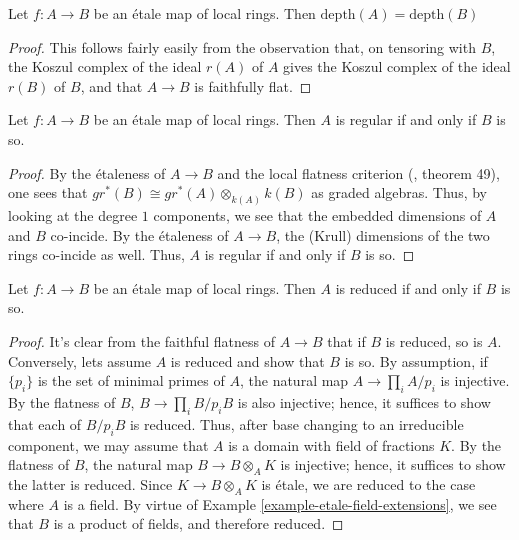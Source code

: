 \begin{proposition}
\label{proposition-etale-dimension}
Let $f : A \to B$ be an \'etale map of local rings. Then
$\mathrm{depth}(A) = \mathrm{depth}(B)$
\end{proposition}

\begin{proof}
This follows fairly easily from the observation that, on tensoring with
$B$, the Koszul complex of the ideal $r(A)$ of $A$ gives the Koszul complex
of the ideal $r(B)$ of $B$, and that $A \to B$ is faithfully flat.
\end{proof}

\begin{proposition}
\label{proposition-etale-regular}
Let $f : A \to B$ be an \'etale map of local rings. Then $A$ is regular if and
only if $B$ is so.
\end{proposition}

\begin{proof}
By the \'etaleness of $A \to B$ and the local flatness criterion
(\cite{MatCA}, theorem 49), one sees that
$gr^*(B) \cong gr^*(A) \otimes_{k(A)} k(B)$ as graded algebras. Thus,
by looking at the degree $1$ components, we see that the embedded
dimensions of $A$ and $B$ co-incide. By the \'etaleness of $A \to B$,
the (Krull) dimensions of the two rings co-incide as well. Thus, $A$ is
regular if and only if $B$ is so.
\end{proof}

\begin{proposition}
\label{proposition-etale-reduced}
Let $f : A \to B$ be an \'etale map of local rings. Then $A$ is reduced if and
only if $B$ is so.
\end{proposition}

\begin{proof}
It's clear from the faithful flatness of $A \to B$ that if $B$ is reduced, so
is $A$. Conversely, lets assume $A$ is reduced and show that $B$ is so. By
assumption, if $\{p_i\}$ is the set of minimal primes of $A$, the natural map
$A \to \prod_i A/p_i$ is injective. By the flatness of $B$,
$B \to \prod_i B/p_iB$ is also injective; hence, it suffices to show that each
of $B/p_iB$ is reduced. Thus, after base changing to an irreducible component,
we may assume that $A$ is a domain with field of fractions $K$. By the
flatness of $B$, the natural map $B \to B \otimes_A K$ is injective; hence,
it suffices to show the latter is reduced. Since $K \to B \otimes_A K$ is
\'etale, we are reduced to the case where $A$ is a field. By virtue of
Example \ref{example-etale-field-extensions}, we see that $B$ is a product of
fields,
and therefore reduced.
\end{proof}



